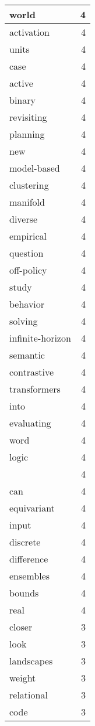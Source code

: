 \begin{table}[h]
\begin{tabular}{|l|r|}
world & 4 \\
\hline
activation & 4 \\
\hline
units & 4 \\
\hline
case & 4 \\
\hline
active & 4 \\
\hline
binary & 4 \\
\hline
revisiting & 4 \\
\hline
planning & 4 \\
\hline
new & 4 \\
\hline
model-based & 4 \\
\hline
clustering & 4 \\
\hline
manifold & 4 \\
\hline
diverse & 4 \\
\hline
empirical & 4 \\
\hline
question & 4 \\
\hline
off-policy & 4 \\
\hline
study & 4 \\
\hline
behavior & 4 \\
\hline
solving & 4 \\
\hline
infinite-horizon & 4 \\
\hline
semantic & 4 \\
\hline
contrastive & 4 \\
\hline
transformers & 4 \\
\hline
into & 4 \\
\hline
evaluating & 4 \\
\hline
word & 4 \\
\hline
logic & 4 \\
\hline
 & 4 \\
\hline
can & 4 \\
\hline
equivariant & 4 \\
\hline
input & 4 \\
\hline
discrete & 4 \\
\hline
difference & 4 \\
\hline
ensembles & 4 \\
\hline
bounds & 4 \\
\hline
real & 4 \\
\hline
closer & 3 \\
\hline
look & 3 \\
\hline
landscapes & 3 \\
\hline
weight & 3 \\
\hline
relational & 3 \\
\hline
code & 3 \\

\end{tabular}
\end{table}
